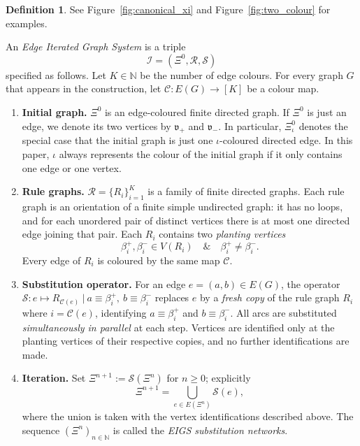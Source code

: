 \documentclass{article}
\theoremstyle{plain}
\theoremstyle{definition}
\newtheorem{definition}[theorem]{Definition}
\begin{document}
\begin{definition}\label{definition:EIGS}
See Figure~\ref{fig:canonical_xi} and Figure~\ref{fig:two_colour} for examples.

An \emph{Edge Iterated Graph System} is a triple
\[
   \mathscr I=(\Xi^{0},\mathcal R,\mathcal S)
\]
specified as follows.
Let $K\in\mathbb N$ be the number of edge colours.
For every graph $G$ that appears in the construction, let
$
   \mathscr{C} : E(G) \longrightarrow[K]
$
be a colour map.

\begin{enumerate}
\item \textbf{Initial graph.}
      $\Xi^{0}$ is an edge-coloured finite directed graph.
      If $\Xi^{0}$ is just an edge, we denote its two vertices by $\mathfrak v_+$ and $\mathfrak v_-$.
      In particular, $\Xi_{\iota}^0$ denotes the special case that the initial graph is just one $\iota$-coloured directed edge.
      In this paper, $\iota$ always represents the colour of the initial graph if it only contains one edge or one vertex.

\item \textbf{Rule graphs.}
      $\mathcal{R} = \{ R_i \}_{i=1}^{K}$ is a family of finite directed graphs.
      Each rule graph is an orientation of a finite simple undirected graph:
      it has no loops, and for each unordered pair of distinct vertices
      there is at most one directed edge joining that pair.
      Each $R_i$ contains two \emph{planting vertices}
      \[
         \beta_i^{+},\beta_i^{-} \in  V(R_i)
         \quad\&\quad
         \beta_i^{+}\neq\beta_i^{-}.
      \]
      Every edge of $R_i$ is coloured by the same map $\mathscr{C}$.

\item \textbf{Substitution operator.}
      For an edge $e=(a,b)\in E(G)$, the operator
      $
         \mathcal S\colon e\longmapsto R_{\mathscr{C}(e)}  \ \big|\
         a\equiv\beta_i^{+},\ b\equiv\beta_i^{-}
      $
      replaces $e$ by a \emph{fresh copy} of the rule graph $R_i$ where \(i=\mathscr C(e)\), identifying
      $
         a\equiv\beta_i^{+}
      $ and
      $
         b\equiv\beta_i^{-}.
      $
      All arcs are substituted \emph{simultaneously in parallel} at each step.
      Vertices are identified only at the planting vertices of their respective copies, and no further identifications are made.

\item \textbf{Iteration.}
      Set $\Xi^{n+1}:=\mathcal S(\Xi^{n})$ for $n\ge 0$; explicitly
      \[
         \Xi^{n+1}
         =
         \bigcup_{e\in E(\Xi^{n})}\mathcal S(e),
      \]
      where the union is taken with the vertex identifications described above.
      The sequence $(\Xi^{n})_{n\in\mathbb N}$ is called the \emph{EIGS substitution networks}.
\end{enumerate}
\end{definition}
\end{document}
